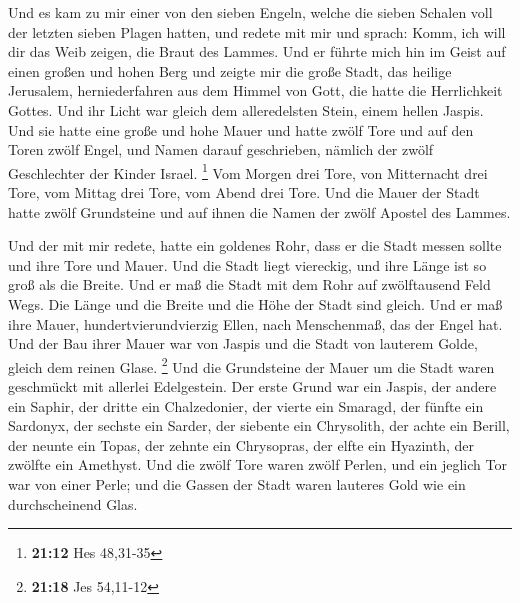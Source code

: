  Und es kam zu mir einer von den sieben Engeln, welche die
sieben Schalen voll der letzten sieben Plagen hatten, und redete mit mir
und sprach: Komm, ich will dir das Weib zeigen, die Braut des Lammes.
 Und er führte mich hin im Geist auf einen großen und
hohen Berg und zeigte mir die große Stadt, das heilige Jerusalem,
herniederfahren aus dem Himmel von Gott,  die hatte die
Herrlichkeit Gottes. Und ihr Licht war gleich dem alleredelsten Stein,
einem hellen Jaspis.  Und sie hatte eine große und hohe
Mauer und hatte zwölf Tore und auf den Toren zwölf Engel, und Namen
darauf geschrieben, nämlich der zwölf Geschlechter der Kinder Israel.
\footnote{\textbf{21:12} Hes 48,31-35}  Vom Morgen drei
Tore, von Mitternacht drei Tore, vom Mittag drei Tore, vom Abend drei
Tore.  Und die Mauer der Stadt hatte zwölf Grundsteine
und auf ihnen die Namen der zwölf Apostel des Lammes.

 Und der mit mir redete, hatte ein goldenes Rohr, dass er
die Stadt messen sollte und ihre Tore und Mauer.  Und die
Stadt liegt viereckig, und ihre Länge ist so groß als die Breite. Und er
maß die Stadt mit dem Rohr auf zwölftausend Feld Wegs. Die Länge und die
Breite und die Höhe der Stadt sind gleich.  Und er maß
ihre Mauer, hundertvierundvierzig Ellen, nach Menschenmaß, das der Engel
hat.  Und der Bau ihrer Mauer war von Jaspis und die
Stadt von lauterem Golde, gleich dem reinen Glase. \footnote{\textbf{21:18}
  Jes 54,11-12}  Und die Grundsteine der Mauer um die
Stadt waren geschmückt mit allerlei Edelgestein. Der erste Grund war ein
Jaspis, der andere ein Saphir, der dritte ein Chalzedonier, der vierte
ein Smaragd,  der fünfte ein Sardonyx, der sechste ein
Sarder, der siebente ein Chrysolith, der achte ein Berill, der neunte
ein Topas, der zehnte ein Chrysopras, der elfte ein Hyazinth, der
zwölfte ein Amethyst.  Und die zwölf Tore waren zwölf
Perlen, und ein jeglich Tor war von einer Perle; und die Gassen der
Stadt waren lauteres Gold wie ein durchscheinend Glas.

